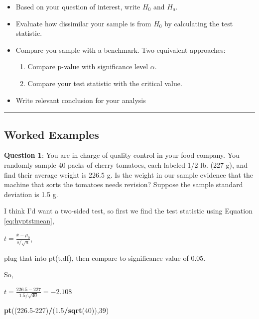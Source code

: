 \documentclass[
  openany]{book}
\newenvironment{Shaded}{\begin{snugshade}}{\end{snugshade}}
\newcommand{\DecValTok}[1]{\textcolor[rgb]{0.00,0.00,0.81}{#1}}
\newcommand{\FloatTok}[1]{\textcolor[rgb]{0.00,0.00,0.81}{#1}}
\newcommand{\FunctionTok}[1]{\textcolor[rgb]{0.13,0.29,0.53}{\textbf{#1}}}
\newcommand{\NormalTok}[1]{#1}
\newcommand{\SpecialCharTok}[1]{\textcolor[rgb]{0.81,0.36,0.00}{\textbf{#1}}}
\providecommand{\tightlist}{%
  \setlength{\itemsep}{0pt}\setlength{\parskip}{0pt}}
\begin{document}
\begin{itemize}
\tightlist
\item
  Based on your question of interest, write \(H_0\) and \(H_a\).
\item
  Evaluate how dissimilar your sample is from \(H_0\) by calculating the test statistic.
\item
  Compare you sample with a benchmark. Two equivalent approaches:

  \begin{enumerate}
  \def\labelenumi{\arabic{enumi}.}
  \tightlist
  \item
    Compare p-value with significance level \(\alpha\).
  \item
    Compare your test statistic with the critical value.
  \end{enumerate}
\item
  Write relevant conclusion for your analysis
\end{itemize}

\begin{center}\rule{0.5\linewidth}{0.5pt}\end{center}

\subsection{Worked Examples}\label{worked-examples}

\textbf{Question 1}: You are in charge of quality control in your food company. You randomly sample 40 packs of cherry tomatoes, each labeled 1/2 lb. (227 g), and find their average weight is 226.5 g. Is the weight in our sample evidence that the machine that sorts the tomatoes needs revision? Suppose the sample standard deviation is 1.5 g.

I think I'd want a two-sided test, so first we find the test statistic using Equation \eqref{eq:hyptstmean},

\(t=\frac{\bar{x}-\mu_0}{s/\sqrt{n}}\),

plug that into pt(t,df), then compare to significance value of 0.05.

So,

\(t=\frac{226.5-227}{1.5/\sqrt{40}}=-2.108\)

\begin{Shaded}
\begin{Highlighting}[]
\FunctionTok{pt}\NormalTok{((}\FloatTok{226.5}\DecValTok{{-}227}\NormalTok{)}\SpecialCharTok{/}\NormalTok{(}\FloatTok{1.5}\SpecialCharTok{/}\FunctionTok{sqrt}\NormalTok{(}\DecValTok{40}\NormalTok{)),}\DecValTok{39}\NormalTok{)}
\end{Highlighting}
\end{Shaded}
\end{document}
